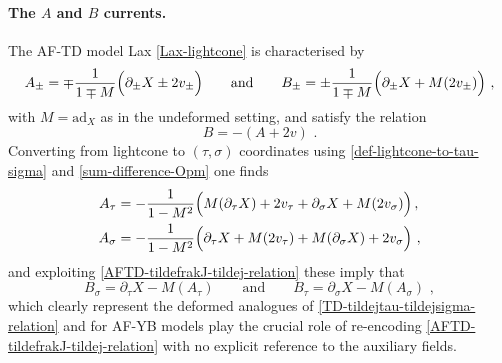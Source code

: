 \documentclass[12pt]{article}
\numberwithin{equation}{section}
\begin{document}
\paragraph{The $A$ and $B$ currents.}
The AF-TD model Lax \eqref{Lax-lightcone} is characterised by 
\begin{equation}
A_{\pm}=\mp\frac{1}{1\mp M}\Bigl( \partial_{\pm}X \pm 2v_{\pm}\Bigr) 
\qquad \text{and} \qquad 
B_{\pm}=\pm\frac{1}{1\mp M}\Bigl( \partial_{\pm}X+M(2v_{\pm}) \Bigr) \,\, ,
\end{equation}
with $M=\mathrm{ad}_{X}$ as in the undeformed setting, and satisfy the relation
\begin{equation}\label{AFTD-tildefrakJ-tildej-relation}
B=-(A+2v) \,\, .
\end{equation}
Converting from lightcone to $(\tau,\sigma)$ coordinates using \eqref{def-lightcone-to-tau-sigma} and \eqref{sum-difference-Opm} one finds
\begin{equation}\label{AF-TD-tildej-tausigma-components}
\begin{aligned}
A_{\tau}&=-\frac{1}{1-M^2}\Bigl( M(\partial_{\tau}X)+2v_{\tau}+\partial_{\sigma}X+M(2v_{\sigma}) \Bigr) \, ,
\\
A_{\sigma}&=-\frac{1}{1-M^2}\Bigl( \partial_{\tau}X+M(2v_{\tau})+M(\partial_{\sigma}X)+2v_{\sigma} \Bigr) \,\, ,
\end{aligned}
\end{equation}
and exploiting \eqref{AFTD-tildefrakJ-tildej-relation} these imply that
\begin{equation}\label{AF-TD-tildej-tildefrakJ-relation}
B_{\sigma}=\partial_{\tau}X-M(A_{\tau})
\qquad \text{and} \qquad 
B_{\tau}=\partial_{\sigma}X-M(A_{\sigma}) \,\, ,
\end{equation}
which clearly represent the deformed analogues of \eqref{TD-tildejtau-tildejsigma-relation} and for AF-YB models play the crucial role of re-encoding \eqref{AFTD-tildefrakJ-tildej-relation} with no explicit reference to the auxiliary fields.
\end{document}
